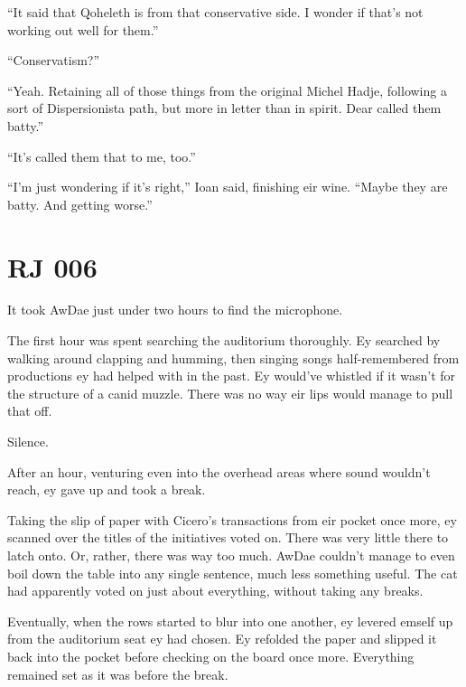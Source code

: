 ``It said that Qoheleth is from that conservative side. I wonder if that's not working out well for them.''

``Conservatism?''

``Yeah. Retaining all of those things from the original Michel Hadje, following a sort of Dispersionista path, but more in letter than in spirit. Dear called them batty.''

``It's called them that to me, too.''

``I'm just wondering if it's right,'' Ioan said, finishing eir wine. ``Maybe they are batty. And getting worse.''


\chapter*{RJ 006}

It took AwDae just under two hours to find the microphone.

The first hour was spent searching the auditorium thoroughly. Ey searched by walking around clapping and humming, then singing songs half-remembered from productions ey had helped with in the past. Ey would've whistled if it wasn't for the structure of a canid muzzle. There was no way eir lips would manage to pull that off.

Silence.

After an hour, venturing even into the overhead areas where sound wouldn't reach, ey gave up and took a break.

Taking the slip of paper with Cicero's transactions from eir pocket once more, ey scanned over the titles of the initiatives voted on. There was very little there to latch onto. Or, rather, there was way too much. AwDae couldn't manage to even boil down the table into any single sentence, much less something useful. The cat had apparently voted on just about everything, without taking any breaks.

Eventually, when the rows started to blur into one another, ey levered emself up from the auditorium seat ey had chosen. Ey refolded the paper and slipped it back into the pocket before checking on the board once more. Everything remained set as it was before the break.

